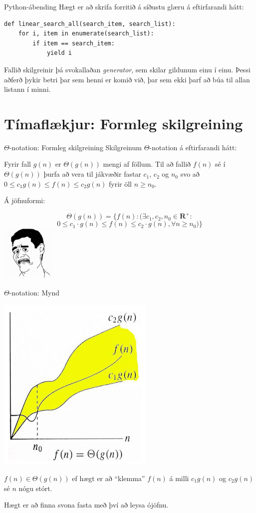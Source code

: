 \documentclass{beamer}
\begin{document}
\begin{frame}[fragile]{Python-ábending}
Hægt er að skrifa forritið á síðustu glæru á eftirfarandi hátt:
\begin{verbatim}
def linear_search_all(search_item, search_list):
    for i, item in enumerate(search_list):
        if item == search_item:
            yield i
\end{verbatim}
Fallið skilgreinir þá svokallaðan \emph{generator}, sem skilar gildunum einu í einu. Þessi aðferð þykir betri þar sem henni er komið við, þar sem ekki þarf að búa til allan listann í minni.
\end{frame}


\section{Tímaflækjur: Formleg skilgreining}

\begin{frame}{$\Theta$-notation: Formleg skilgreining}
Skilgreinum $\Theta$-notation á eftirfarandi hátt:

Fyrir fall $g(n)$ er $\Theta(g(n))$ mengi af föllum. Til að fallið $f(n)$ sé í $\Theta(g(n))$ þurfa að vera til jákvæðir fastar $c_1$, $c_2$ og $n_0$ svo að $0 \leq c_1 g(n) \leq f(n) \leq c_2 g(n)$ fyrir öll $n \geq n_0$.

Á jöfnuformi:

\[\Theta(g(n)) = \{ f(n) : (\exists c_1, c_2, n_0 \in \mathbf{R}^+ :\]
\[0 \leq c_1 \cdot g(n) \leq f(n) \leq c_2 \cdot g(n), \forall n \geq n_0 )\}\]
\pause
\includegraphics[width=0.2\textwidth]{Pics/ewww}
\end{frame}

\begin{frame}{$\Theta$-notation: Mynd}
\begin{center}
\includegraphics[width=0.5\linewidth]{Pics/ThetaAsympoticNotation}
\end{center}
$f(n) \in \Theta(g(n))$ ef hægt er að ``klemma'' $f(n)$ á milli $c_1g(n)$ og $c_2g(n)$ sé $n$ nógu stórt.

Hægt er að finna svona fasta með því að leysa ójöfnu.
\end{frame}
\end{document}
